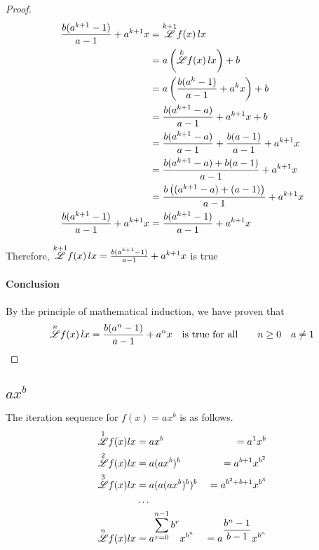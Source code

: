 \documentclass[12pt, letterpaper]{article}
\begin{document}
\begin{proof}
    \begin{align*}
        \frac{b(a^{k+1} - 1)}{a-1} + a^{k+1} x &= \iterator {k+1} f(x) \, lx \\ 
        &= a\left(\iterator {k} f(x) \, lx\right) + b \\ 
        &= a\left(\frac{b(a^k - 1)}{a-1} + a^k x \right) + b \\ 
        &= \frac{b(a^{k+1} - a)}{a-1} + a^{k+1} x  + b \\ 
% 
        &= \frac{b(a^{k+1} - a)}{a-1} + \frac{b(a-1)}{a-1} + a^{k+1} x  \\ 
% 
        &= \frac{b(a^{k+1} - a) + b(a-1)}{a-1} + a^{k+1} x  \\ 
% 
        &= \frac{b\left((a^{k+1} - a) + (a-1)\right)}{a-1} + a^{k+1} x  \\ 
% 
        \frac{b(a^{k+1} - 1)}{a-1} + a^{k+1} x &=
        \frac{b(a^{k+1} - 1)}{a-1} + a^{k+1} x  \\ 
    \end{align*}

    Therefore, $\overset{k+1}{\mathscr{L}} f(x) \, lx = \frac{b(a^{k+1} - 1)}{a-1} + a^{k+1} x$ is true 

    \paragraph{Conclusion} By the principle of mathematical induction, we have proven that
    $$\overset{n}{\mathscr{L}} f(x) \, lx = \frac{b(a^n - 1)}{a-1} + a^n x \quad \text {is true for all} \qquad n \ge 0 \quad a \ne 1$$
\end{proof}


\subsection{$ax^b$}

The iteration sequence for {$f(x) = ax^{b}$} is as follows.
\begin{alignat*}{3}
    \overset{1}{\mathscr{L}} f(x)lx &= ax^{b}               &= a^{1}x^{b} \\
    \overset{2}{\mathscr{L}} f(x)lx &= a(ax^{b}) ^{b}       &= a^{b+1}x^{b^{2}} \\
    \overset{3}{\mathscr{L}} f(x)lx &= a(a(ax^{b})^{b})^{b} &= a^{b^{2} + b + 1} x^{b^{3}} \\
       &\dots \\
    \overset{n}{\mathscr{L}} f(x)lx &= a^{\displaystyle \sum_{r=0}^{n-1} b^{r}}  x^{b^{n}}  &=
    a^{\displaystyle \frac{b^{n}-1}{b-1}}x^{b^{n}}
\end{alignat*}
\end{document}
